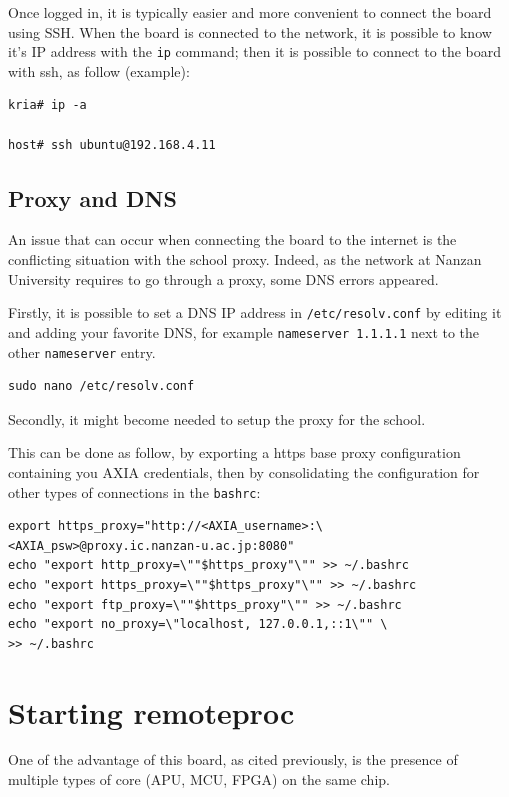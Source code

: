 \documentclass[10pt]{article}
\begin{document}
Once logged in, it is typically easier and more convenient to connect the board using SSH.
When the board is connected to the network, it is possible to know it's IP address with
the \verb|ip| command; then it is possible to connect to the board with ssh, as follow (example):
\begin{tcolorbox}
\begin{verbatim}
kria# ip -a

host# ssh ubuntu@192.168.4.11
\end{verbatim}
\end{tcolorbox}

\subsection{Proxy and DNS}
\label{sec:proxy-dns}
An issue that can occur when connecting the board to the internet is the conflicting situation with
the school proxy.
Indeed, as the network at Nanzan University requires to go through a proxy, some DNS errors appeared.

Firstly, it is possible to set a DNS IP address in \verb|/etc/resolv.conf| by editing it and adding your favorite DNS, for example \verb|nameserver 1.1.1.1|
next to the other \verb|nameserver| entry.
\begin{tcolorbox}
\begin{verbatim}
sudo nano /etc/resolv.conf
\end{verbatim}
\end{tcolorbox}

Secondly, it might become needed to setup the proxy for the school.

This can be done as follow, by exporting a https base proxy configuration containing you AXIA credentials, then
by consolidating the configuration for other types of connections in the \verb|bashrc|:
\begin{tcolorbox}
\begin{verbatim}
export https_proxy="http://<AXIA_username>:\
<AXIA_psw>@proxy.ic.nanzan-u.ac.jp:8080"
echo "export http_proxy=\""$https_proxy"\"" >> ~/.bashrc
echo "export https_proxy=\""$https_proxy"\"" >> ~/.bashrc
echo "export ftp_proxy=\""$https_proxy"\"" >> ~/.bashrc
echo "export no_proxy=\"localhost, 127.0.0.1,::1\"" \
>> ~/.bashrc
\end{verbatim}
\end{tcolorbox}


\section{Starting remoteproc}
\label{sec:starting-remoteproc}
One of the advantage of this board, as cited previously, is the presence of
multiple types of core (APU, MCU, FPGA) on the same chip.
\end{document}
